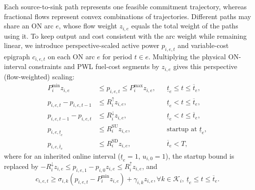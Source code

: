 \documentclass[journal]{IEEEtran}
\newcommand{\Pmin}{P^{\min}}
\newcommand{\Pmax}{P^{\max}}
\newcommand{\Rup}{R^{\uparrow}}
\newcommand{\Rdn}{R^{\downarrow}}
\begin{document}
Each source-to-sink path represents one feasible commitment trajectory, whereas fractional flows represent convex combinations of trajectories. Different paths may share an ON arc $e$, whose flow weight $z_{i,e}$ equals the total weight of the paths using it. To keep output and cost consistent with the arc weight while remaining linear, we introduce perspective-scaled active power $p_{i,e,t}$ and variable-cost epigraph $c_{i,e,t}$ on each ON arc $e$ for period $t\in e$. Multiplying the physical ON-interval constraints and PWL fuel-cost segments by $z_{i,e}$ gives this perspective (flow-weighted) scaling:
\begin{subequations}\label{eq:interval}
\begin{align}
\Pmin_i z_{i,e} &\le p_{i,e,t}\le\Pmax_i z_{i,e}, && \underline{t}_e\le t\le\overline{t}_e,\\
p_{i,e,t}-p_{i,e,t-1} &\le \Rup_i z_{i,e}, && \underline{t}_e<t\le\overline{t}_e,\\
p_{i,e,t-1}-p_{i,e,t} &\le \Rdn_i z_{i,e}, && \underline{t}_e<t\le\overline{t}_e,\\
p_{i,e,\underline{t}_e} &\le R_i^{\mathrm{SU}} z_{i,e}, && \text{startup at }\underline{t}_e,\\
p_{i,e,\overline{t}_e} &\le R_i^{\mathrm{SD}} z_{i,e}, && \overline{t}_e<T,
\end{align}
\end{subequations}
where for an inherited online interval ($\!\underline{t}_e\!\!=\!\!1$, $\!\!u_{i,0}\!\!=\!\!1$), the startup bound is replaced by $-\Rdn_i z_{i,e}\!\!\le\!\! p_{i,e,1}\!\!-\!\!p_{i,0}z_{i,e}\!\!\le\!\!\Rup_i z_{i,e}$, and
\begin{equation}
\!\!\!\!c_{i,e,t}\!\! \ge\!\! \sigma_{i,k}\!\left(p_{i,e,t}\!\!-\!\!\Pmin_i z_{i,e}\right) \!\!+\!\! \gamma_{i,k}z_{i,e},  \forall k\!\!\in\!\!\mathcal{K}_i,\ \underline{t}_e\!\!\le\!\! t\!\!\le\!\!\overline{t}_e.\label{eq:perspective}
\end{equation}
\end{document}
